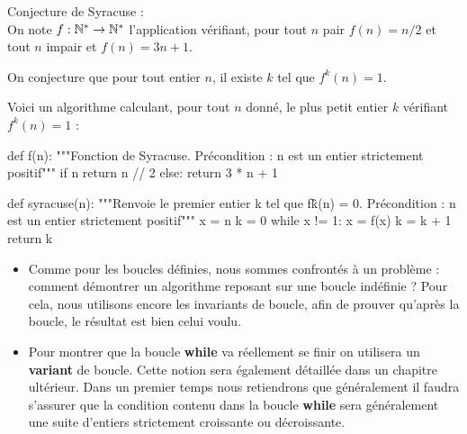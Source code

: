 

\label{ex-syracuse} Conjecture de Syracuse :\\
On note $f : \mathbb{N}^{*} \to \mathbb{N}^{*}$ l'application vérifiant, pour tout $n$ pair
$f(n)=n/2$ et tout $n$ impair et $f(n)=3n+1$.

On conjecture que pour tout entier $n$, il existe $k$ tel que
$f^{k}(n)=1$.

Voici un algorithme calculant, pour tout $n$ donné, le plus petit
entier $k$ vérifiant $f^{k}(n) = 1$ :

\begin{pyverbatim}
def f(n):
    """Fonction de Syracuse.
    Précondition : n est un entier strictement positif"""
    if n %
        return n // 2
    else:
        return 3 * n + 1
        
def syracuse(n):
    """Renvoie le premier entier k tel que  f\^k(n) = 0.
    Précondition : n est un entier strictement positif"""
    x = n
    k = 0
    while x != 1:
        x = f(x)
        k = k + 1
    return k
\end{pyverbatim}



\begin{rem}
\begin{itemize}
\item Comme pour les boucles définies, nous sommes confrontés à un problème : comment démontrer un 
algorithme reposant sur une boucle indéfinie ? Pour cela, nous utilisons encore les invariants de 
boucle, afin de prouver qu'après la boucle, le résultat est bien celui voulu.
\item Pour montrer que la boucle \textbf{while} va réellement se finir on utilisera un \textbf{variant} de boucle. Cette notion sera également détaillée dans un chapitre ultérieur. Dans un premier temps nous retiendrons que généralement il faudra s'assurer que la condition contenu dans la boucle \textbf{while} sera généralement une suite d'entiers strictement croissante ou décroissante.
\end{itemize}
\end{rem}


